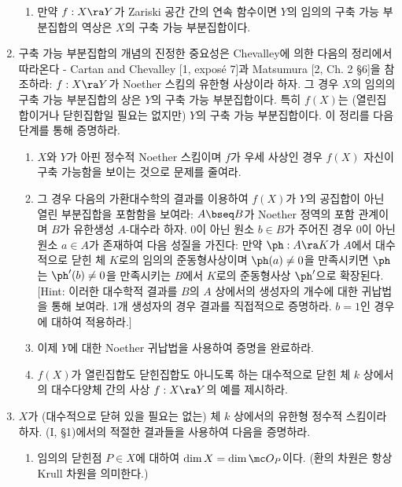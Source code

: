 \begin{enumerate}[label=\tb{3.\arabic*.},itemindent=0mm,itemsep=2mm]
\begin{enumerate}[label=(\alph*)]
	\item 만약 $f:X\ra Y$가 Zariski 공간 간의 연속 함수이면 $Y$의 임의의 구축 가능 부분집합의 역상은 $X$의 구축 가능 부분집합이다.
	\end{enumerate}
	\item 구축 가능 부분집합의 개념의 진정한 중요성은 Chevalley에 의한 다음의 정리에서 따라온다 - 
	Cartan and Chevalley [1, expos\'e 7]과 Matsumura [2, Ch. 2 \S 6]을 참조하라:
	$f:X\ra Y$가 Noether 스킴의 유한형 사상이라 하자. 그 경우 $X$의 임의의 구축 가능 부분집합의 상은 $Y$의 구축 가능 부분집합이다.
	특히 $f(X)$는 (열린집합이거나 닫힌집합일 필요는 없지만) $Y$의 구축 가능 부분집합이다. 이 정리를 다음 단계를 통해 증명하라.
	\begin{enumerate}[label=(\alph*)]
	\item $X$와 $Y$가 아핀 정수적 Noether 스킴이며 $f$가 우세 사상인 경우 $f(X)$ 자신이 구축 가능함을 보이는 것으로 문제를 줄여라.
	\end{enumerate}
	\begin{enumerate}[label=*(\alph*)]
	\setcounter{enumii}{1}
	\item 그 경우 다음의 가환대수학의 결과를 이용하여 $f(X)$가 $Y$의 공집합이 아닌 열린 부분집합을 포함함을 보여라:
	$A\bseq B$가 Noether 정역의 포함 관계이며 $B$가 유한생성 $A$-대수라 하자.
	0이 아닌 원소 $b\in B$가 주어진 경우 0이 아닌 원소 $a\in A$가 존재하여 다음 성질을 가진다:
	만약 $\ph:A\ra K$가 $A$에서 대수적으로 닫힌 체 $K$로의 임의의 준동형사상이며 $\ph(a)\ne 0$을 만족시키면
	$\ph$는 $\ph'(b)\ne 0$을 만족시키는 $B$에서 $K$로의 준동형사상 $\ph'$으로 확장된다.
	[Hint: 이러한 대수학적 결과를 $B$의 $A$ 상에서의 생성자의 개수에 대한 귀납법을 통해 보여라.
	1개 생성자의 경우 결과를 직접적으로 증명하라. $b=1$인 경우에 대하여 적용하라.]
	\end{enumerate}
	\begin{enumerate}[label=(\alph*)]
	\setcounter{enumii}{2}
	\item 이제 $Y$에 대한 Noether 귀납법을 사용하여 증명을 완료하라.
	\item $f(X)$가 열린집합도 닫힌집합도 아니도록 하는 대수적으로 닫힌 체 $k$ 상에서의 대수다양체 간의 사상 $f:X\ra Y$의 예를 제시하라.
	\end{enumerate}
	\item {} $X$가 (대수적으로 닫혀 있을 필요는 없는) 체 $k$ 상에서의 유한형 정수적 스킴이라 하자.
	(I, \S 1)에서의 적절한 결과들을 사용하여 다음을 증명하라.
	\begin{enumerate}[label=(\alph*)]
	\item 임의의 닫힌점 $P\in X$에 대하여 $\dim X=\dim\mc O_P$이다. (환의 차원은 항상 Krull 차원을 의미한다.)

\end{enumerate}
\end{enumerate}
